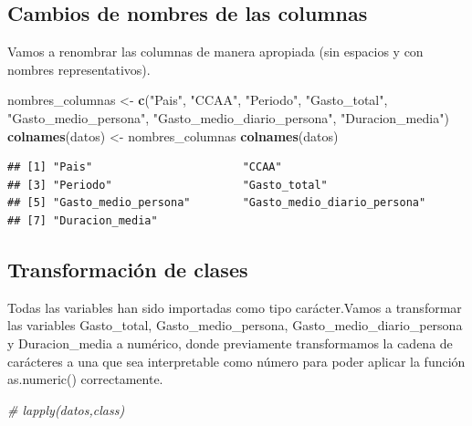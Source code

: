 \documentclass[data,article,submit,moreauthors,pdftex]{Definitions/mdpi}
\newenvironment{Shaded}{\begin{snugshade}}{\end{snugshade}}
\newcommand{\CommentTok}[1]{\textcolor[rgb]{0.56,0.35,0.01}{\textit{#1}}}
\newcommand{\FunctionTok}[1]{\textcolor[rgb]{0.13,0.29,0.53}{\textbf{#1}}}
\newcommand{\NormalTok}[1]{#1}
\newcommand{\OtherTok}[1]{\textcolor[rgb]{0.56,0.35,0.01}{#1}}
\newcommand{\StringTok}[1]{\textcolor[rgb]{0.31,0.60,0.02}{#1}}
\begin{document}
\subsection{Cambios de nombres de las
columnas}\label{cambios-de-nombres-de-las-columnas}

Vamos a renombrar las columnas de manera apropiada (sin espacios y con
nombres representativos).

\begin{Shaded}
\begin{Highlighting}[]
\NormalTok{nombres\_columnas }\OtherTok{\textless{}{-}} \FunctionTok{c}\NormalTok{(}\StringTok{"Pais"}\NormalTok{, }\StringTok{"CCAA"}\NormalTok{, }\StringTok{"Periodo"}\NormalTok{, }\StringTok{"Gasto\_total"}\NormalTok{,}
    \StringTok{"Gasto\_medio\_persona"}\NormalTok{, }\StringTok{"Gasto\_medio\_diario\_persona"}\NormalTok{, }\StringTok{"Duracion\_media"}\NormalTok{)}
\FunctionTok{colnames}\NormalTok{(datos) }\OtherTok{\textless{}{-}}\NormalTok{ nombres\_columnas}
\FunctionTok{colnames}\NormalTok{(datos)}
\end{Highlighting}
\end{Shaded}

\begin{verbatim}
## [1] "Pais"                       "CCAA"                      
## [3] "Periodo"                    "Gasto_total"               
## [5] "Gasto_medio_persona"        "Gasto_medio_diario_persona"
## [7] "Duracion_media"
\end{verbatim}

\subsection{Transformación de clases}\label{transformaciuxf3n-de-clases}

Todas las variables han sido importadas como tipo carácter.Vamos a
transformar las variables Gasto\_total, Gasto\_medio\_persona,
Gasto\_medio\_diario\_persona y Duracion\_media a numérico, donde
previamente transformamos la cadena de carácteres a una que sea
interpretable como número para poder aplicar la función as.numeric()
correctamente.

\begin{Shaded}
\begin{Highlighting}[]
\CommentTok{\# lapply(datos,class)}
\end{Highlighting}
\end{Shaded}
\end{document}
